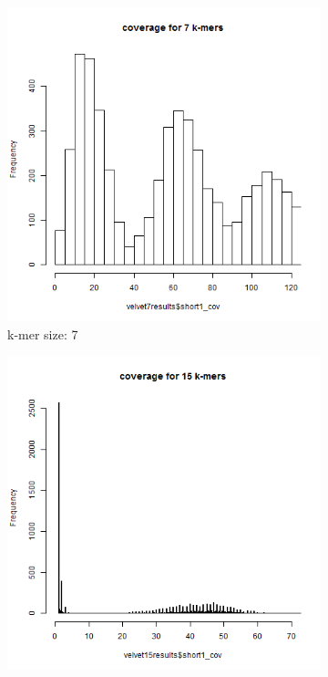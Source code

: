 \documentclass[%
   10pt,              %
   ngerman,           %
   a4paper,           %
   DIV11,             %
]{scrartcl}%
\begin{document}
\begin{figure}[h]
	\begin{subfigure}[t] {0.2\textwidth}
	\includegraphics[width=\textwidth]{exercise2/velvet7kmersCoverage.png}
	\caption{k-mer size: 7}
	\label{Velvet-7-mers-coverage}
	\end{subfigure}
	\begin{subfigure}[t] {0.2\textwidth}
		\includegraphics[width=\textwidth]{exercise2/velvet15kmersCoverage.png}

\end{subfigure}
\end{figure}
\end{document}
